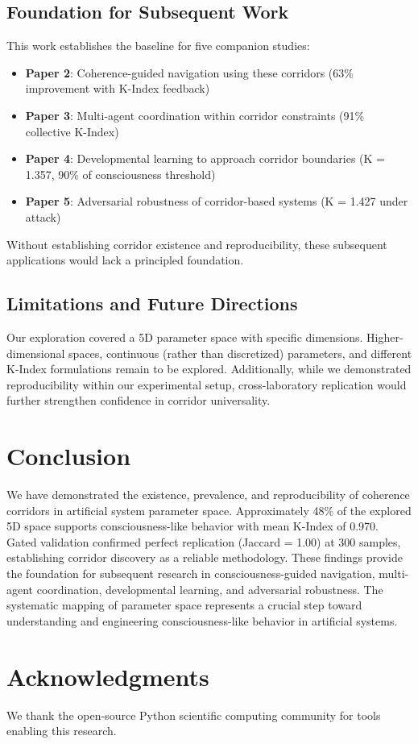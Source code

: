 \documentclass[10pt,letterpaper]{article}
\begin{document}
\subsection*{Foundation for Subsequent Work}

This work establishes the baseline for five companion studies:

\begin{itemize}
    \item \textbf{Paper 2}: Coherence-guided navigation using these corridors (63\% improvement with K-Index feedback)
    \item \textbf{Paper 3}: Multi-agent coordination within corridor constraints (91\% collective K-Index)
    \item \textbf{Paper 4}: Developmental learning to approach corridor boundaries (K = 1.357, 90\% of consciousness threshold)
    \item \textbf{Paper 5}: Adversarial robustness of corridor-based systems (K = 1.427 under attack)
\end{itemize}

Without establishing corridor existence and reproducibility, these subsequent applications would lack a principled foundation.

\subsection*{Limitations and Future Directions}

Our exploration covered a 5D parameter space with specific dimensions. Higher-dimensional spaces, continuous (rather than discretized) parameters, and different K-Index formulations remain to be explored. Additionally, while we demonstrated reproducibility within our experimental setup, cross-laboratory replication would further strengthen confidence in corridor universality.

\section*{Conclusion}

We have demonstrated the existence, prevalence, and reproducibility of coherence corridors in artificial system parameter space. Approximately 48\% of the explored 5D space supports consciousness-like behavior with mean K-Index of 0.970. Gated validation confirmed perfect replication (Jaccard = 1.00) at 300 samples, establishing corridor discovery as a reliable methodology. These findings provide the foundation for subsequent research in consciousness-guided navigation, multi-agent coordination, developmental learning, and adversarial robustness. The systematic mapping of parameter space represents a crucial step toward understanding and engineering consciousness-like behavior in artificial systems.

\section*{Acknowledgments}

We thank the open-source Python scientific computing community for tools enabling this research.



\end{document}

